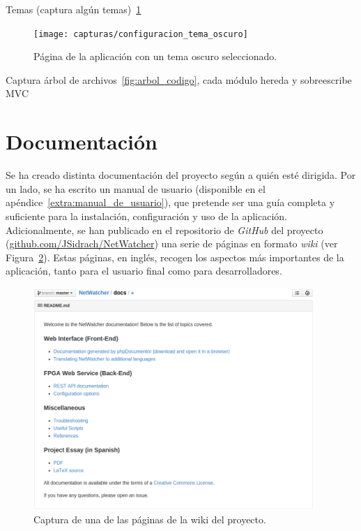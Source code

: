 Temas (captura algún temas)~\ref{fig:captura:oscuro}
\begin{figure}[!htp]
  \centering
  \texttt{[image: capturas/configuracion\_tema\_oscuro]}
  \caption{Página de la aplicación con un tema oscuro seleccionado.}
  \label{fig:captura:oscuro}
\end{figure}

Captura árbol de archivos~\ref{fig:arbol_codigo}, cada módulo hereda y sobreescribe MVC

\section{Documentación \label{sec:imp:docs}}

Se ha creado distinta documentación del proyecto según a quién esté dirigida.
Por un lado, se ha escrito un manual de usuario (disponible en el apéndice~\ref{extra:manual_de_usuario}), que pretende ser una guía completa y suficiente para la instalación, configuración y uso de la aplicación.
Adicionalmente, se han publicado en el repositorio de \textit{GitHub} del proyecto (\url{github.com/JSidrach/NetWatcher}) una serie de páginas en formato \textit{wiki} (ver Figura~\ref{fig:captura:wiki}). Estas páginas, en inglés, recogen los aspectos más importantes de la aplicación, tanto para el usuario final como para desarrolladores.

\begin{figure}[!htp]
  \centering
  \includegraphics[width=0.95\textwidth,clip=true]{graphics/capturas/github_docs}
  \caption{Captura de una de las páginas de la wiki del proyecto.}
  \label{fig:captura:wiki}
\end{figure}

